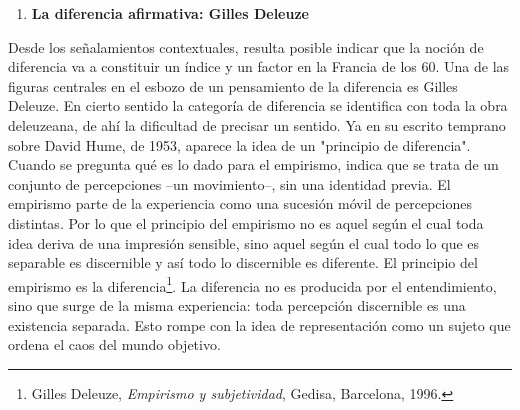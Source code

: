 \documentclass{book}
\begin{document}
\begin{enumerate}
\def\labelenumi{\arabic{enumi}.}
\setcounter{enumi}{2}
\item
  \textbf{La diferencia afirmativa: Gilles Deleuze}
\end{enumerate}

Desde los señalamientos contextuales, resulta posible indicar que la
noción de diferencia va a constituir un índice y un factor en la Francia
de los 60. Una de las figuras centrales en el esbozo de un pensamiento
de la diferencia es Gilles Deleuze. En cierto sentido la categoría de
diferencia se identifica con toda la obra deleuzeana, de ahí la
dificultad de precisar un sentido. Ya en su escrito temprano sobre David
Hume, de 1953, aparece la idea de un "principio de diferencia". Cuando
se pregunta qué es lo dado para el empirismo, indica que se trata de un
conjunto de percepciones --un movimiento--, sin una identidad previa. El
empirismo parte de la experiencia como una sucesión móvil de
percepciones distintas. Por lo que el principio del empirismo no es
aquel según el cual toda idea deriva de una impresión sensible, sino
aquel según el cual todo lo que es separable es discernible y así todo
lo discernible es diferente. El principio del empirismo es la
diferencia\footnote{Gilles Deleuze, \emph{Empirismo y subjetividad},
  Gedisa, Barcelona, 1996.}. La diferencia no es producida por el
entendimiento, sino que surge de la misma experiencia: toda percepción
discernible es una existencia separada. Esto rompe con la idea de
representación como un sujeto que ordena el caos del mundo objetivo.
\end{document}
